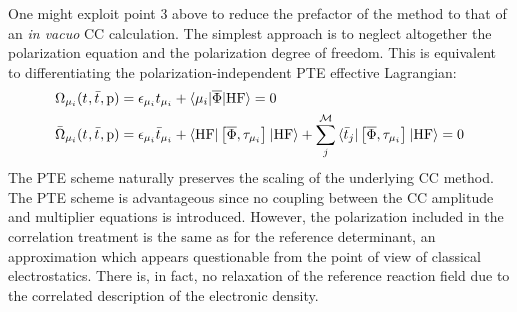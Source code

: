 One might exploit point 3 above to reduce the prefactor of the method to
that of an \emph{in vacuo} \acs{CC} calculation.
The simplest approach is to neglect altogether the polarization equation
and the polarization degree of freedom. This is equivalent to
differentiating the polarization-independent \acs{PTE} effective
Lagrangian:
\begin{subequations}
  \begin{align}
   \Omega_{\mu_i}(t_{}, \bar{t}_{}, \mathrm{p})  &=
   \epsilon_{\mu_i}t_{\mu_i} + \braket{\mu_i | \overline{\Phi} | \mathrm{HF}}
    = 0 \\
   \bar{\Omega}_{\mu_i}(t_{}, \bar{t}_{}, \mathrm{p})
    &=
    \epsilon_{\mu_i}\bar{t}_{\mu_i} +
    \braket{\mathrm{HF} | \left[ \overline{\Phi}, \tau_{\mu_i} \right]^{} | \mathrm{HF}} +
    \sum_{j}^{\mathcal{M}}\braket{\bar{t}_{j} |
    \left[ \overline{\Phi}, \tau_{\mu_i} \right]^{} | \mathrm{HF}}
    = 0
  \end{align}
\end{subequations}
The \acs{PTE} scheme naturally preserves the scaling of the underlying \acs{CC}
method.
The \acs{PTE} scheme is advantageous since no coupling between the
\acs{CC} amplitude and multiplier equations is introduced. However, the
polarization included in the correlation treatment is the same as for
the reference determinant, an approximation which appears questionable
from the point of view of classical electrostatics.
There is, in fact, no relaxation of the reference reaction
field due to the correlated description of the electronic density.

